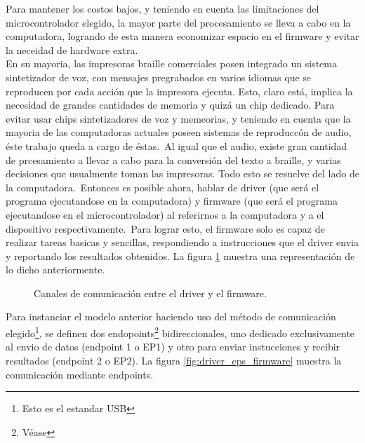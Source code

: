 Para mantener los costos bajos, y teniendo en cuenta las limitaciones del
microcontrolador elegido, la mayor parte del procesamiento se lleva a cabo
en la computadora, logrando de esta manera economizar espacio en el firmware y
evitar la neceidad de hardware extra.\\

En su mayoria, las impresoras braille comerciales posen integrado un sistema
sintetizador de voz, con mensajes pregrabados en varios idiomas que se
reproducen por cada acci\'on que la impresora ejecuta. Esto, claro est\'a,
implica la necesidad de grandes cantidades de memoria y quiz\'a un chip
dedicado. Para evitar usar chips sintetizadores de voz y memeorias, y
teniendo en cuenta que la mayoria de las computadoras actuales poseen sistemas
de reproducc\'on de audio, \'este trabajo queda a cargo de \'estas.\
Al igual que el audio, existe gran cantidad de prcesamiento a llevar a cabo
para la conversi\'on del texto a braille, y varias decisiones que usualmente
toman las impresoras. Todo esto se resuelve del lado de la computadora.\
Entonces es posible ahora, hablar de driver (que ser\'a el programa
ejecutandose en la computadora) y firmware (que ser\'a el programa ejecutandose
en el microcontrolador) al referirnos a la computadora y a el dispositivo
respectivamente.\
Para lograr esto, el firmware solo es capaz de realizar tareas basicas y
sencillas, respondiendo a instrucciones que el driver envia y reportando los
resultados obtenidos. La figura \ref{fig:driver_firmware} muestra una
representaci\'on de lo dicho anteriormente.\\

\begin{figure}[htp]
\centering
{}
\caption{Canales de comunicaci\'on entre el driver y el firmware.}
\label{fig:driver_firmware}
\end{figure}


Para instanciar el modelo anterior haciendo uso del m\'etodo de comunicaci\'on
elegido\footnote{Esto es el estandar USB}, se definen dos
endopoints\footnote{V\'ease } bidireccionales, uno
dedicado exclusivamente al envio de datos (endpoint 1 o EP1) y otro para enviar
instucciones y recibir resultados (endpoint 2 o EP2). La figura
\ref{fig:driver_eps_firmware} muestra la comunicaci\'on mediante endpoints.



